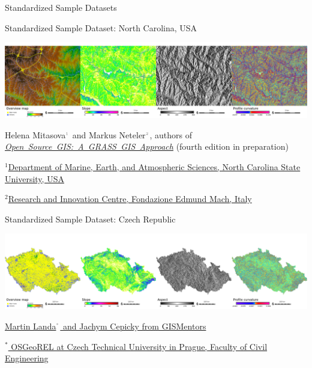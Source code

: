 \documentclass[xcolor={dvipsnames,usenames},beamer]{beamer}
\newcommand{\n}[1]{$^{\textcolor{gray}{\mbox{\tiny{#1}}}}$}
\begin{document}
\begin{frame}[fragile]{Standardized Sample Datasets}
\end{frame}



\begin{frame}{Standardized Sample Dataset: North Carolina, USA}

\begin{center}
\includegraphics[width=\textwidth]{./images/dataset/std_dataset_nc_stripe.png}
\end{center}


Helena Mitasova\n{1} and Markus Neteler\n{2}, authors of
\mbox{\href{http://grassbook.org/}{\it Open Source GIS: A GRASS GIS Approach}}
{\scriptsize (fourth edition in preparation)}

\bigskip

{\scriptsize
$^1$\href{http://www.meas.ncsu.edu/}%
{Department of Marine, Earth, and Atmospheric Sciences,
North Carolina State University, USA}

$^2$\href{http://gis.cri.fmach.it/}%
{Research and Innovation Centre, Fondazione Edmund Mach, Italy}
}

\end{frame}

\begin{frame}{Standardized Sample Dataset: Czech Republic}

\begin{center}
\includegraphics[width=\textwidth]{./images/dataset/std_dataset_cz_stripe.png}
\end{center}

\href{http://gismentors.eu/}{Martin Landa\n{*} and Jachym Cepicky from GISMentors}

\bigskip

$^*$\href{http://geomatics.fsv.cvut.cz/research/osgeorel/}%
{\scriptsize
OSGeoREL
at Czech Technical University in Prague,
Faculty of Civil Engineering
}

\end{frame}
\end{document}

